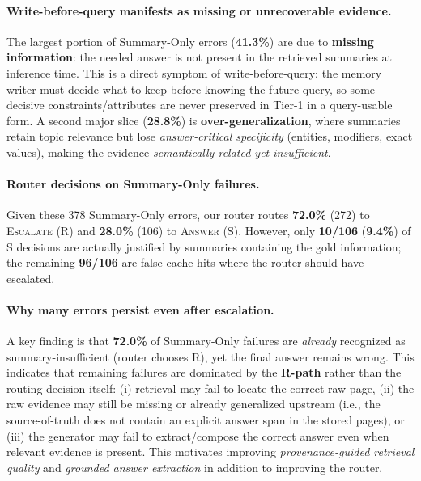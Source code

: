 \documentclass{article}
\theoremstyle{plain}
\theoremstyle{definition}
\theoremstyle{remark}
\begin{document}
\paragraph{Write-before-query manifests as missing or unrecoverable evidence.}
The largest portion of Summary-Only errors (\textbf{41.3\%}) are due to \textbf{missing information}:
the needed answer is not present in the retrieved summaries at inference time.
This is a direct symptom of write-before-query: the memory writer must decide what to keep before knowing the future query, so some decisive constraints/attributes are never preserved in Tier-1 in a query-usable form.
A second major slice (\textbf{28.8\%}) is \textbf{over-generalization}, where summaries retain topic relevance but lose \emph{answer-critical specificity} (entities, modifiers, exact values), making the evidence \emph{semantically related yet insufficient}.

\paragraph{Router decisions on Summary-Only failures.}
Given these 378 Summary-Only errors, our router routes \textbf{72.0\%} (272) to \textsc{Escalate} (R) and \textbf{28.0\%} (106) to \textsc{Answer} (S).
However, only \textbf{10/106} (\textbf{9.4\%}) of S decisions are actually justified by summaries containing the gold information;
the remaining \textbf{96/106} are false cache hits where the router should have escalated.

\paragraph{Why many errors persist even after escalation.}
A key finding is that \textbf{72.0\%} of Summary-Only failures are \emph{already} recognized as summary-insufficient (router chooses R), yet the final answer remains wrong.
This indicates that remaining failures are dominated by the \textbf{R-path} rather than the routing decision itself:
(i) retrieval may fail to locate the correct raw page,
(ii) the raw evidence may still be missing or already generalized upstream (i.e., the source-of-truth does not contain an explicit answer span in the stored pages), or
(iii) the generator may fail to extract/compose the correct answer even when relevant evidence is present.
This motivates improving \emph{provenance-guided retrieval quality} and \emph{grounded answer extraction} in addition to improving the router.
\end{document}
